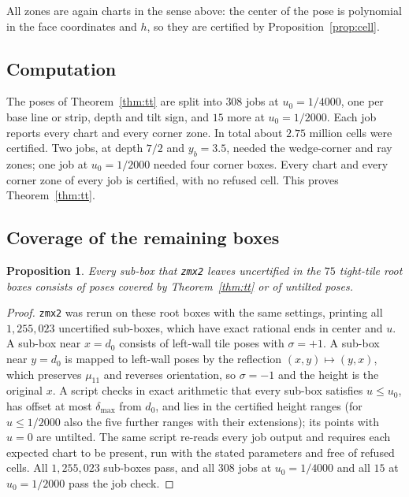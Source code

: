 \documentclass[11pt]{amsart}
\newtheorem{proposition}[theorem]{Proposition}
\theoremstyle{definition}
\theoremstyle{remark}
\begin{document}
All zones are again charts in the sense above: the center of the pose is polynomial in the face coordinates and $h$,
so they are certified by Proposition~\ref{prop:cell}.

\subsection{Computation}
The poses of Theorem~\ref{thm:tt} are split into $308$ jobs at $u_0=1/4000$, one per base line or strip, depth and
tilt sign, and $15$ more at $u_0=1/2000$. Each job reports every chart and every corner zone. In total about $2.75$
million cells were certified. Two jobs, at depth $7/2$ and $y_b=3.5$, needed the wedge-corner and ray zones; one job
at $u_0=1/2000$ needed four corner boxes. Every chart and every corner zone of every job is certified, with no
refused cell. This proves Theorem~\ref{thm:tt}.

\subsection{Coverage of the remaining boxes}\label{sec:coverage}

\begin{proposition}\label{prop:coverage}
Every sub-box that \texttt{zmx2} leaves uncertified in the $75$ tight-tile root boxes consists of poses covered by
Theorem~\ref{thm:tt} or of untilted poses.
\end{proposition}

\begin{proof}
\texttt{zmx2} was rerun on these root boxes with the same settings, printing all $1{,}255{,}023$ uncertified
sub-boxes, which have exact rational ends in center and $u$. A sub-box near $x=d_0$ consists of left-wall tile poses
with $\sigma=+1$. A sub-box near $y=d_0$ is mapped to left-wall poses by the reflection $(x,y)\mapsto(y,x)$, which
preserves $\mu_{11}$ and reverses orientation, so $\sigma=-1$ and the height is the original $x$. A script checks in exact arithmetic that every sub-box
satisfies $u\le u_0$, has offset at most $\delta_{\max}$ from $d_0$, and lies in the certified height ranges (for $u\le1/2000$ also the five further ranges with their extensions); its
points with $u=0$ are untilted. The same script re-reads every job output and requires each expected chart to be
present, run with the stated parameters and free of refused cells. All $1{,}255{,}023$ sub-boxes pass, and all $308$ jobs at $u_0=1/4000$ and all $15$ at
$u_0=1/2000$ pass the job check.
\end{proof}
\end{document}
